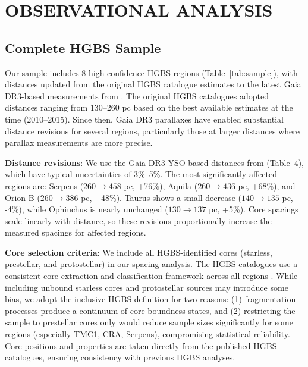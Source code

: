 \documentclass[twoside,twocolumn]{mnras}
\begin{document}
\section{OBSERVATIONAL ANALYSIS}

\subsection{Complete HGBS Sample}

Our sample includes 8 high-confidence HGBS regions (Table~\ref{tab:sample}), with distances updated from the original HGBS catalogue estimates to the latest Gaia DR3-based measurements from \citet{Zhang2023}. The original HGBS catalogues \citep{Konyves2015, Konyves2020, Andre2016, Ladjelate2020} adopted distances ranging from 130--260 pc based on the best available estimates at the time (2010--2015). Since then, Gaia DR3 parallaxes have enabled substantial distance revisions for several regions, particularly those at larger distances where parallax measurements are more precise.

\textbf{Distance revisions}: We use the Gaia DR3 YSO-based distances from \citet{Zhang2023} (Table~4), which have typical uncertainties of 3\%--5\%. The most significantly affected regions are: Serpens ($260 \to 458$ pc, +76\%), Aquila ($260 \to 436$ pc, +68\%), and Orion B ($260 \to 386$ pc, +48\%). Taurus shows a small decrease ($140 \to 135$ pc, -4\%), while Ophiuchus is nearly unchanged ($130 \to 137$ pc, +5\%). Core spacings scale linearly with distance, so these revisions proportionally increase the measured spacings for affected regions.

\textbf{Core selection criteria}: We include all HGBS-identified cores (starless, prestellar, and protostellar) in our spacing analysis. The HGBS catalogues use a consistent core extraction and classification framework across all regions \citep{Konyves2015, Konyves2020}. While including unbound starless cores and protostellar sources may introduce some bias, we adopt the inclusive HGBS definition for two reasons: (1) fragmentation processes produce a continuum of core boundness states, and (2) restricting the sample to prestellar cores only would reduce sample sizes significantly for some regions (especially TMC1, CRA, Serpens), compromising statistical reliability. Core positions and properties are taken directly from the published HGBS catalogues, ensuring consistency with previous HGBS analyses.
\end{document}
